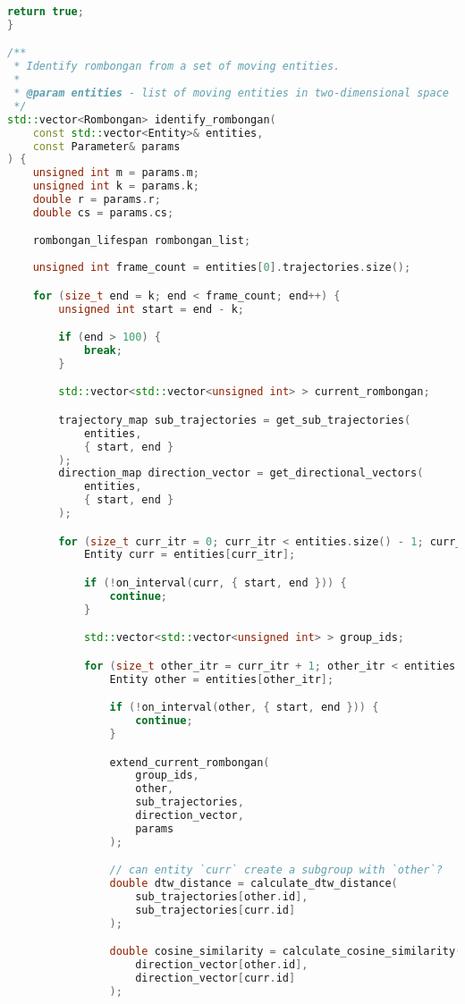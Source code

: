 \begin{lstlisting}[language=C++, caption=Implementasi fungsi \texttt{identify\_rombongan}, label={lamp:identify-rombongan}]
    return true;
}

/**
 * Identify rombongan from a set of moving entities.
 * 
 * @param entities - list of moving entities in two-dimensional space
 */
std::vector<Rombongan> identify_rombongan(
    const std::vector<Entity>& entities,
    const Parameter& params
) {
    unsigned int m = params.m;
    unsigned int k = params.k;
    double r = params.r;
    double cs = params.cs;

    rombongan_lifespan rombongan_list;
    
    unsigned int frame_count = entities[0].trajectories.size();

    for (size_t end = k; end < frame_count; end++) {
        unsigned int start = end - k;

        if (end > 100) {
            break;
        }

        std::vector<std::vector<unsigned int> > current_rombongan;

        trajectory_map sub_trajectories = get_sub_trajectories(
            entities,
            { start, end }
        );
        direction_map direction_vector = get_directional_vectors(
            entities,
            { start, end }
        );

        for (size_t curr_itr = 0; curr_itr < entities.size() - 1; curr_itr++) {
            Entity curr = entities[curr_itr];

            if (!on_interval(curr, { start, end })) {
                continue;
            }

            std::vector<std::vector<unsigned int> > group_ids;

            for (size_t other_itr = curr_itr + 1; other_itr < entities.size(); other_itr++) {
                Entity other = entities[other_itr];

                if (!on_interval(other, { start, end })) {
                    continue;
                }

                extend_current_rombongan(
                    group_ids,
                    other,
                    sub_trajectories,
                    direction_vector,
                    params
                );

                // can entity `curr` create a subgroup with `other`?
                double dtw_distance = calculate_dtw_distance(
                    sub_trajectories[other.id],
                    sub_trajectories[curr.id]
                );

                double cosine_similarity = calculate_cosine_similarity(
                    direction_vector[other.id],
                    direction_vector[curr.id]
                );


\end{lstlisting}
